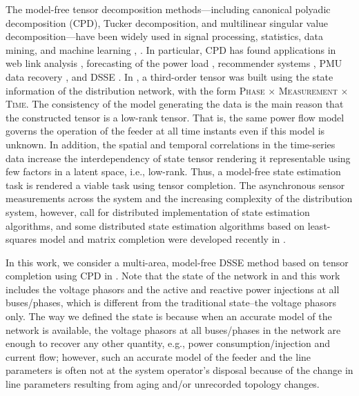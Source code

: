 \documentclass[journal]{IEEEtran}
\newcounter{thm}
\newcounter{define}
\newcommand{\revision}[1]{{\color{black} #1}} %
\newcommand{\rev}[1]{{\color{black} #1}} %
\begin{document}
The model-free tensor decomposition methods---including canonical polyadic decomposition (CPD), Tucker decomposition, and multilinear singular value decomposition---have been widely used in signal processing, statistics, data mining, and machine learning\rev{\cite{Shin2017IEEETKD}}, \cite{Sidiropoulos2017IEEESP, Kolda2009}. In particular, CPD has found applications in web link analysis \cite{kolda2005higher}, forecasting of the power load \cite{Song2017}, recommender systems \cite{Karatzoglou2010ACM}, \rev{PMU data recovery \cite{Osipov2020IEEETPS}}, and DSSE \cite{Zamzam2020}. In \cite{Zamzam2020}, a third-order tensor was built using the state information of the distribution network, with the form \textsc{Phase} $\times$ \textsc{Measurement} $\times$ \textsc{Time}.
\revision{
The consistency of the model generating the data is the main reason that the constructed tensor is a low-rank tensor. That is, the same power flow model governs the operation of the feeder at all time instants even if this model is unknown.
In addition, the spatial and temporal correlations in the time-series data increase the interdependency of state tensor rendering it representable using few factors in a latent space, i.e., low-rank. Thus, a model-free state estimation task is rendered a viable task using tensor completion.} The asynchronous sensor measurements across the system and the increasing complexity of the distribution system, however, call for distributed implementation of state estimation algorithms, and some distributed state estimation algorithms based on least-squares model and matrix completion were developed recently in \cite{Kekatos2013IEEEPS,zhou2019gradient,Muscas2015IEEIM,Zhu2014IEEESTSP, Sagan2019}. 

In this work, we consider a multi-area, model-free DSSE method based on tensor completion using CPD in \revision{\cite{Zamzam2020}}.  \revision{Note that the state of the network in \cite{Zamzam2020} and this work includes
the voltage phasors and  the
 active and reactive power injections at all buses/phases, which is different from the traditional state--the voltage phasors only. The way we defined the state is because when an accurate model of the network is available, the voltage phasors at all buses/phases in the network are enough to
recover any other quantity, e.g., power consumption/injection
and current flow; however, such an accurate model of
the feeder and the line parameters is often not at the system
operator’s disposal because of the change in line
parameters resulting from aging and/or unrecorded topology
changes.
} 
 
\end{document}
